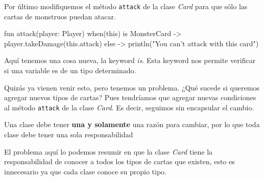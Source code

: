   Por último modifiquemos el método \texttt{attack} de la clase \textit{Card} para que sólo las
  cartas de monstruos puedan atacar.

  \begin{kotlin}
    fun attack(player: Player) {
      when(this) {
        is MonsterCard -> player.takeDamage(this.attack)
        else -> println("You can't attack with this card")
      }
    }
  \end{kotlin}

  Aquí tenemos una cosa nueva, la keyword \textit{is}.
  Esta keyword nos permite verificar si una variable es de un tipo determinado.

  Quizás ya vienen venir esto, pero tenemos un problema.
  ¿Qué sucede si queremos agregar nuevos tipos de cartas?
  Pues tendríamos que agregar nuevas condiciones al método \texttt{attack} de la clase 
  \textit{Card}.
  Es decir, seguimos sin encapsular el cambio.

  \begin{defaultbox}
    Una clase debe tener \textbf{una y solamente} una razón para cambiar, por lo que toda clase 
    debe tener una sola responsabilidad
  \end{defaultbox}

  El problema aquí lo podemos resumir en que la clase \textit{Card} tiene la responsabilidad de
  conocer a todos los tipos de cartas que existen, esto es innecesario ya que cada clase conoce
  su propio tipo.
